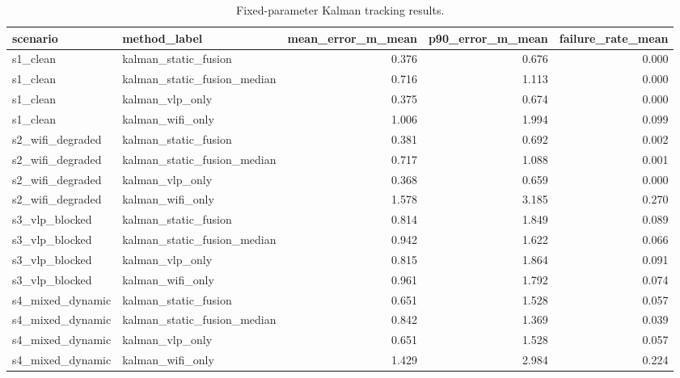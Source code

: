 \begin{table}[t]
\centering
\caption{Fixed-parameter Kalman tracking results.}
\label{tab:tracking_results}
\begin{tabular}{llrrr}
\toprule
scenario & method_label & mean_error_m_mean & p90_error_m_mean & failure_rate_mean \\
\midrule
s1_clean & kalman_static_fusion & 0.376 & 0.676 & 0.000 \\
s1_clean & kalman_static_fusion_median & 0.716 & 1.113 & 0.000 \\
s1_clean & kalman_vlp_only & 0.375 & 0.674 & 0.000 \\
s1_clean & kalman_wifi_only & 1.006 & 1.994 & 0.099 \\
s2_wifi_degraded & kalman_static_fusion & 0.381 & 0.692 & 0.002 \\
s2_wifi_degraded & kalman_static_fusion_median & 0.717 & 1.088 & 0.001 \\
s2_wifi_degraded & kalman_vlp_only & 0.368 & 0.659 & 0.000 \\
s2_wifi_degraded & kalman_wifi_only & 1.578 & 3.185 & 0.270 \\
s3_vlp_blocked & kalman_static_fusion & 0.814 & 1.849 & 0.089 \\
s3_vlp_blocked & kalman_static_fusion_median & 0.942 & 1.622 & 0.066 \\
s3_vlp_blocked & kalman_vlp_only & 0.815 & 1.864 & 0.091 \\
s3_vlp_blocked & kalman_wifi_only & 0.961 & 1.792 & 0.074 \\
s4_mixed_dynamic & kalman_static_fusion & 0.651 & 1.528 & 0.057 \\
s4_mixed_dynamic & kalman_static_fusion_median & 0.842 & 1.369 & 0.039 \\
s4_mixed_dynamic & kalman_vlp_only & 0.651 & 1.528 & 0.057 \\
s4_mixed_dynamic & kalman_wifi_only & 1.429 & 2.984 & 0.224 \\
\bottomrule
\end{tabular}
\end{table}
